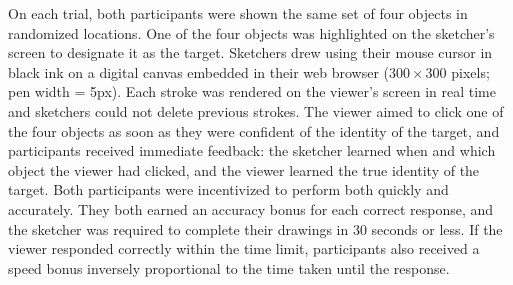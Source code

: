 \documentclass[10pt,letterpaper]{article}
\begin{document}
On each trial, both participants were shown the same set of four objects in randomized locations.
One of the four objects was highlighted on the sketcher's screen to designate it as the target.
Sketchers drew using their mouse cursor in black ink on a digital canvas embedded in their web browser ($300 \times 300$ pixels; pen width = 5px).
Each stroke was rendered on the viewer's screen in real time and sketchers could not delete previous strokes.
The viewer aimed to click one of the four objects as soon as they were confident of the identity of the target, and participants received immediate feedback: the sketcher learned when and which object the viewer had clicked, and the viewer learned the true identity of the target.
Both participants were incentivized to perform both quickly and accurately.
They both earned an accuracy bonus for each correct response, and the sketcher was required to complete their drawings in 30 seconds or less.
If the viewer responded correctly within the time limit, participants also received a speed bonus inversely proportional to the time taken until the response.


\end{document}
